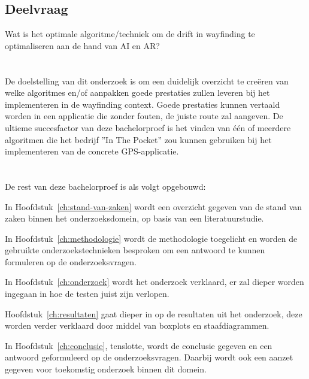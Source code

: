 \subsection{Deelvraag}
Wat is het optimale algoritme/techniek om de drift in wayfinding te optimaliseren aan de hand van AI en AR? 

\section{}
\label{sec:onderzoeksdoelstelling}

De doelstelling van dit onderzoek is om een duidelijk overzicht te creëren van welke algoritmes en/of aanpakken goede prestaties zullen leveren bij het implementeren in de wayfinding context. Goede prestaties kunnen vertaald worden in een applicatie die zonder fouten, de juiste route zal aangeven.
De ultieme succesfactor van deze bachelorproef is het vinden van één of meerdere algoritmen die het bedrijf ''In The Pocket'' zou kunnen gebruiken bij het implementeren van de concrete GPS-applicatie.



\section{}
\label{sec:opzet-bachelorproef}


De rest van deze bachelorproef is als volgt opgebouwd:

In Hoofdstuk~\ref{ch:stand-van-zaken} wordt een overzicht gegeven van de stand van zaken binnen het onderzoeksdomein, op basis van een literatuurstudie.

In Hoofdstuk~\ref{ch:methodologie} wordt de methodologie toegelicht en worden de gebruikte onderzoekstechnieken besproken om een antwoord te kunnen formuleren op de onderzoeksvragen.

In Hoofdstuk~\ref{ch:onderzoek} wordt het onderzoek verklaard, er zal dieper worden ingegaan in hoe de testen juist zijn verlopen.

Hoofdstuk~\ref{ch:resultaten} gaat dieper in op de resultaten uit het onderzoek, deze worden verder verklaard door middel van boxplots en staafdiagrammen.


In Hoofdstuk~\ref{ch:conclusie}, tenslotte, wordt de conclusie gegeven en een antwoord geformuleerd op de onderzoeksvragen. Daarbij wordt ook een aanzet gegeven voor toekomstig onderzoek binnen dit domein.
